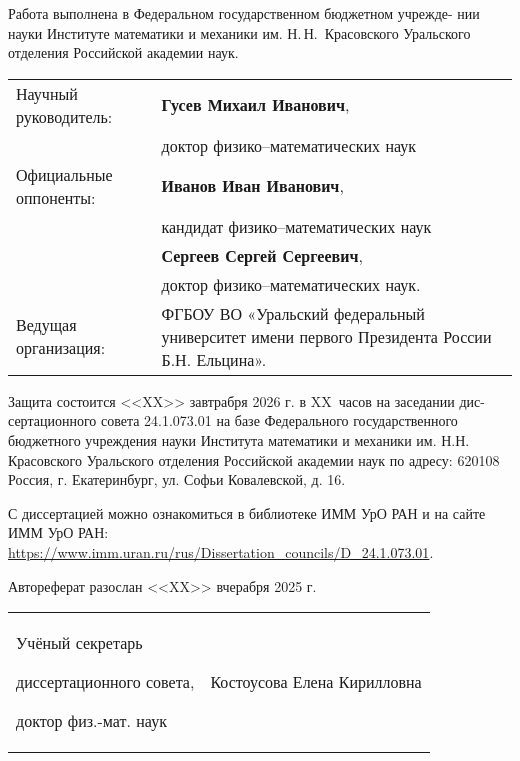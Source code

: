 \documentclass[../abstract.tex]{subfiles}
\begin{document}
Работа выполнена в Федеральном государственном бюджетном учрежде-
нии науки Институте математики и механики им. Н.\,Н.~Красовского Уральского отделения Российской академии наук.

\vspace{1em}
\noindent
\begin{tabular}{@{}p{}p{}@{}}
Научный руководитель: & \textbf{Гусев Михаил Иванович},\\
& доктор физико–математических наук\\

Официальные оппоненты: & \textbf{Иванов Иван Иванович},\\
& кандидат физико–математических наук\\
& \textbf{Сергеев Сергей Сергеевич},\\
& доктор физико–математических наук.\\

Ведущая организация: & ФГБОУ ВО «Уральский федеральный университет имени первого Президента России Б.Н. Ельцина».\\
\end{tabular}

\vspace{5em}
\noindent
Защита состоится <<XX>> завтрабря 2026 г. в XX~часов на заседании дис-
сертационного совета 24.1.073.01 на базе Федерального государственного
бюджетного учреждения науки Института математики и механики им.
Н.Н. Красовского Уральского отделения Российской академии наук по
адресу: 620108 Россия, г. Екатеринбург, ул. Софьи Ковалевской, д. 16.

\vspace{5em}
\noindent
С диссертацией можно ознакомиться в библиотеке ИММ УрО РАН и на
сайте ИММ УрО РАН:\\
\href{https://www.imm.uran.ru/rus/Dissertation_councils/D_24.1.073.01}{https://www.imm.uran.ru/rus/Dissertation\_councils/D\_24.1.073.01}.

\vspace{5em}
\noindent
Автореферат разослан <<XX>> вчерабря 2025 г.

\vspace{2em}
\noindent
\begin{tabular}{@{}b{}b{}@{}}
Учёный секретарь 

диссертационного совета, 

доктор физ.-мат. наук & \hfill Костоусова Елена Кирилловна
\end{tabular}
\newpage
\end{document}
